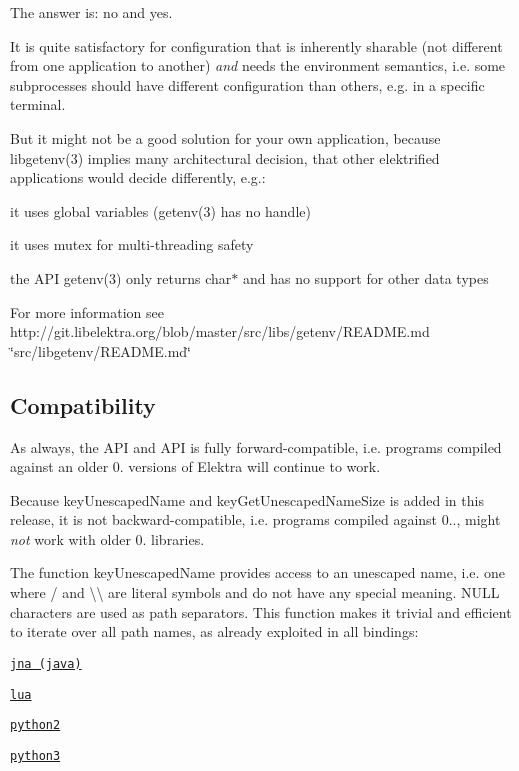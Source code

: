 The answer is\+: no and yes.

It is quite satisfactory for configuration that is inherently sharable (not different from one application to another) {\itshape and} needs the environment semantics, i.\+e. some subprocesses should have different configuration than others, e.\+g. in a specific terminal.

But it might not be a good solution for your own application, because libgetenv(3) implies many architectural decision, that other elektrified applications would decide differently, e.\+g.\+:


\begin{DoxyItemize}
\item it uses global variables (getenv(3) has no handle)
\item it uses mutex for multi-\/threading safety
\item the A\+P\+I getenv(3) only returns {\ttfamily char$\ast$} and has no support for other data types
\end{DoxyItemize}

For more information see http\+://git.libelektra.\+org/blob/master/src/libs/getenv/\+R\+E\+A\+D\+M\+E.md \char`\"{}src/libgetenv/\+R\+E\+A\+D\+M\+E.\+md\char`\"{}

\subsection*{Compatibility}

As always, the A\+P\+I and A\+P\+I is fully forward-\/compatible, i.\+e. programs compiled against an older 0. versions of Elektra will continue to work.

Because {\ttfamily key\+Unescaped\+Name} and {\ttfamily key\+Get\+Unescaped\+Name\+Size} is added in this release, it is not backward-\/compatible, i.\+e. programs compiled against 0.., might {\itshape not} work with older 0. libraries.

The function {\ttfamily key\+Unescaped\+Name} provides access to an unescaped name, i.\+e. one where {\ttfamily /} and {\ttfamily \textbackslash{}\textbackslash{}} are literal symbols and do not have any special meaning. {\ttfamily N\+U\+L\+L} characters are used as path separators. This function makes it trivial and efficient to iterate over all path names, as already exploited in all bindings\+:


\begin{DoxyItemize}
\item \href{http://git.libelektra.org/blob/master/src/bindings/jna/HelloElektra.java}{\tt jna (java)}
\item \href{http://git.libelektra.org/blob/master/src/bindings/swig/lua/tests/test_key.lua}{\tt lua}
\item \href{http://git.libelektra.org/blob/master/src/bindings/swig/python2/tests/testpy2_key.py}{\tt python2}
\item \href{http://git.libelektra.org/blob/master/src/bindings/swig/python/tests/test_key.py}{\tt python3}
\end{DoxyItemize}

